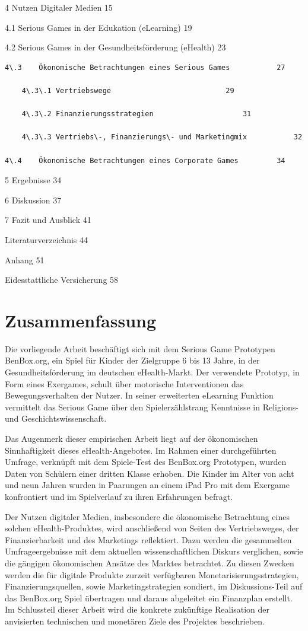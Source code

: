 \documentclass[
  a4paper,
  DIV=11,
  numbers=noendperiod,
  onecolumn,
  oneside,
  a4paper]{scrartcl}
\begin{document}
4 Nutzen Digitaler Medien 15

4.1 Serious Games in der Edukation (eLearning) 19

4.2 Serious Games in der Gesundheitsförderung (eHealth) 23

\begin{verbatim}
4\.3    Ökonomische Betrachtungen eines Serious Games           27

    4\.3\.1 Vertriebswege                           29

    4\.3\.2 Finanzierungsstrategien                     31

    4\.3\.3 Vertriebs\-, Finanzierungs\- und Marketingmix           32

4\.4    Ökonomische Betrachtungen eines Corporate Games         34
\end{verbatim}

5 Ergebnisse 34

6 Diskussion 37

7 Fazit und Ausblick 41

Literaturverzeichnis 44

Anhang 51

Eidesstattliche Versicherung 58

\section{Zusammenfassung}\label{zusammenfassung}

Die vorliegende Arbeit beschäftigt sich mit dem Serious Game Prototypen
BenBox.org, ein Spiel für Kinder der Zielgruppe 6 bis 13 Jahre, in der
Gesundheitsförderung im deutschen eHealth-Markt. Der verwendete
Prototyp, in Form eines Exergames, schult über motorische Interventionen
das Bewegungsverhalten der Nutzer. In seiner erweiterten eLearning
Funktion vermittelt das Serious Game über den Spielerzählstrang
Kenntnisse in Religions- und Geschichtswissenschaft.

Das Augenmerk dieser empirischen Arbeit liegt auf der ökonomischen
Sinnhaftigkeit dieses eHealth-Angebotes. Im Rahmen einer durchgeführten
Umfrage, verknüpft mit dem Spiele-Test des BenBox.org Prototypen, wurden
Daten von Schülern einer dritten Klasse erhoben. Die Kinder im Alter von
acht und neun Jahren wurden in Paarungen an einem iPad Pro mit dem
Exergame konfrontiert und im Spielverlauf zu ihren Erfahrungen befragt.

Der Nutzen digitaler Medien, insbesondere die ökonomische Betrachtung
eines solchen eHealth-Produktes, wird anschließend von Seiten des
Vertriebsweges, der Finanzierbarkeit und des Marketings reflektiert.
Dazu werden die gesammelten Umfrageergebnisse mit dem aktuellen
wissenschaftlichen Diskurs verglichen, sowie die gängigen ökonomischen
Ansätze des Marktes betrachtet. Zu diesen Zwecken werden die für
digitale Produkte zurzeit verfügbaren Monetarisierungsstrategien,
Finanzierungsquellen, sowie Marketingstrategien sondiert, im
Diskussions-Teil auf das BenBox.org Spiel übertragen und daraus
abgeleitet ein Finanzplan erstellt. Im Schlussteil dieser Arbeit wird
die konkrete zukünftige Realisation der anvisierten technischen und
monetären Ziele des Projektes beschrieben.
\end{document}
